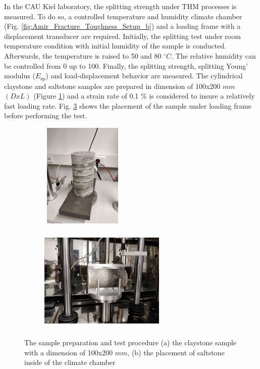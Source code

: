 In the CAU Kiel laboratory, the splitting strength under THM processes is measured. To do so, a controlled temperature and humidity climate chamber (Fig. \ref{fig:Amir_Fracture_Toughness_Setup_b}) and a loading frame with a displacement transducer are required. Initially, the splitting test under room temperature condition with initial humidity of the sample is conducted. Afterwards, the temperature is raised to 50 and 80 $^{\circ}C$. The relative humidity can be controlled from 0 up to 100. Finally, the splitting strength, splitting Young’ modulus ($E_\text{sp}$) and load-displacement behavior are measured. The cylindrical claystone and saltstone samples are prepared in dimension of 100x200 $mm$ $(DxL)$ (Figure \ref{fig:Amir_Splitting_Sample}) and a strain rate of  0.1 \% is considered to insure a relatively fast loading rate. Fig. \ref{fig:Amir_Splitting_Setup} shows the placement of the sample under loading frame before performing the test.

\begin{figure}[!ht]
\centering
\begin{subfigure}[c]{0.3\textwidth}
\centering
\includegraphics[width=4cm,height=5cm]{figures/Amir_Splitting_Sample.png}
\subcaption{}
\label{fig:Amir_Splitting_Sample}
\end{subfigure}
\hfill
\begin{subfigure}[c]{0.6\textwidth}
\centering
\includegraphics[width=6cm,height=5cm]{figures/Amir_Splitting_Setup.png}
\subcaption{}
\label{fig:Amir_Splitting_Setup}
\end{subfigure}
\caption{The sample preparation and test procedure (a) the claystone sample with a dimension of 100x200 $mm$, (b) the placement of saltstone inside of the climate chamber}
\end{figure}

